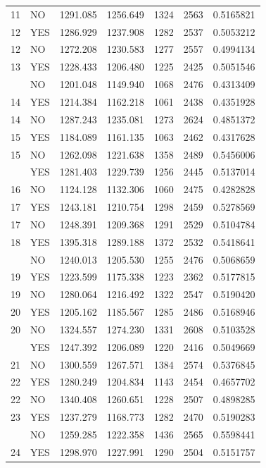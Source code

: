 \documentclass[]{book}
\begin{document}
\begin{table}[t]
\begin{tabular}{rlrrrrr}
11 & NO & 1291.085 & 1256.649 & 1324 & 2563 & 0.5165821\\
12 & YES & 1286.929 & 1237.908 & 1282 & 2537 & 0.5053212\\
12 & NO & 1272.208 & 1230.583 & 1277 & 2557 & 0.4994134\\
13 & YES & 1228.433 & 1206.480 & 1225 & 2425 & 0.5051546\\
\addlinespace
13 & NO & 1201.048 & 1149.940 & 1068 & 2476 & 0.4313409\\
14 & YES & 1214.384 & 1162.218 & 1061 & 2438 & 0.4351928\\
14 & NO & 1287.243 & 1235.081 & 1273 & 2624 & 0.4851372\\
15 & YES & 1184.089 & 1161.135 & 1063 & 2462 & 0.4317628\\
15 & NO & 1262.098 & 1221.638 & 1358 & 2489 & 0.5456006\\
\addlinespace
16 & YES & 1281.403 & 1229.739 & 1256 & 2445 & 0.5137014\\
16 & NO & 1124.128 & 1132.306 & 1060 & 2475 & 0.4282828\\
17 & YES & 1243.181 & 1210.754 & 1298 & 2459 & 0.5278569\\
17 & NO & 1248.391 & 1209.368 & 1291 & 2529 & 0.5104784\\
18 & YES & 1395.318 & 1289.188 & 1372 & 2532 & 0.5418641\\
\addlinespace
18 & NO & 1240.013 & 1205.530 & 1255 & 2476 & 0.5068659\\
19 & YES & 1223.599 & 1175.338 & 1223 & 2362 & 0.5177815\\
19 & NO & 1280.064 & 1216.492 & 1322 & 2547 & 0.5190420\\
20 & YES & 1205.162 & 1185.567 & 1285 & 2486 & 0.5168946\\
20 & NO & 1324.557 & 1274.230 & 1331 & 2608 & 0.5103528\\
\addlinespace
21 & YES & 1247.392 & 1206.089 & 1220 & 2416 & 0.5049669\\
21 & NO & 1300.559 & 1267.571 & 1384 & 2574 & 0.5376845\\
22 & YES & 1280.249 & 1204.834 & 1143 & 2454 & 0.4657702\\
22 & NO & 1340.408 & 1260.651 & 1228 & 2507 & 0.4898285\\
23 & YES & 1237.279 & 1168.773 & 1282 & 2470 & 0.5190283\\
\addlinespace
23 & NO & 1259.285 & 1222.358 & 1436 & 2565 & 0.5598441\\
24 & YES & 1298.970 & 1227.991 & 1290 & 2504 & 0.5151757\\

\end{tabular}
\end{table}
\end{document}
